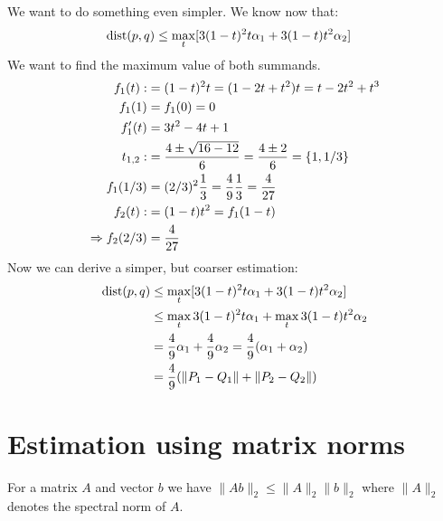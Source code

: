 We want to do something even simpler.
We know now that:
%
\begin{align*}
\mathrm{dist}(p,q) &\leq \max_t [ 3(1-t)^2 t \alpha_1 + 3 (1-t) t^2 \alpha_2 ]
\end{align*}
%
We want to find the maximum value of both summands.
%
\begin{align*}
f_1(t) :&= (1-t)^2 t = (1-2t+t^2)t = t - 2t^2 + t^3 \\
f_1(1) &= f_1(0) = 0 \\
f_1'(t) &= 3t^2 -4t +1 \\
t_{1,2} :&= \frac{4 \pm \sqrt{16-12}}{6} = \frac {4 \pm 2}6 = \{1, 1/3\} \\
f_1(1/3) &= (2/3)^2 \frac 13 = \frac 49 \frac 13 = \frac{4}{27} \\
f_2(t) :&= (1-t)t^2 = f_1(1-t) \\
\Rightarrow f_2(2/3) &= \frac 4{27}
\end{align*}
%
Now we can derive a simper, but coarser estimation:
%
\begin{align*}
\mathrm{dist}(p,q) &\leq \max_t  [ 3(1-t)^2 t \alpha_1 + 3 (1-t) t^2 \alpha_2 ] \\
&\leq \max_t 3(1-t)^2 t \alpha_1 + \max_t 3 (1-t) t^2 \alpha_2 \\
&= \frac 49 \alpha_1 + \frac 49 \alpha_2 = \frac 49 (\alpha_1 + \alpha_2) \\
&= \frac 49 (\|P_1-Q_1\| + \|P_2-Q_2\|)
\end{align*}

\section{Estimation using matrix norms}

For a matrix $A$ and vector $b$ we have $\|A b\|_2 \leq \|A\|_2 \|b\|_2$ where $\|A\|_2$ denotes the spectral norm of $A$.


